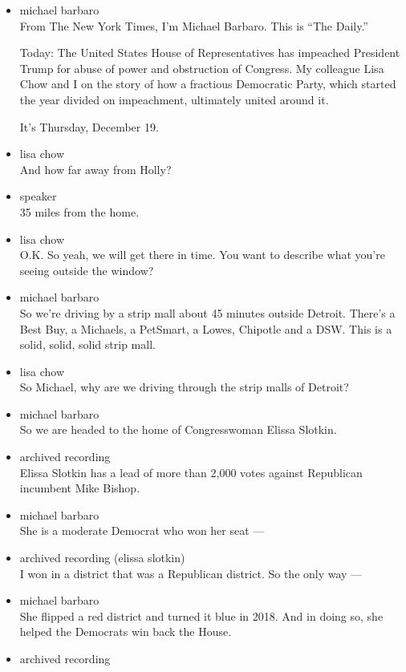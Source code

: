 \begin{itemize}
\item
  michael barbaro\\
  From The New York Times, I'm Michael Barbaro. This is ``The Daily.''

  Today: The United States House of Representatives has impeached
  President Trump for abuse of power and obstruction of Congress. My
  colleague Lisa Chow and I on the story of how a fractious Democratic
  Party, which started the year divided on impeachment, ultimately
  united around it.

  It's Thursday, December 19.
\item
  lisa chow\\
  And how far away from Holly?
\item
  speaker\\
  35 miles from the home.
\item
  lisa chow\\
  O.K. So yeah, we will get there in time. You want to describe what
  you're seeing outside the window?
\item
  michael barbaro\\
  So we're driving by a strip mall about 45 minutes outside Detroit.
  There's a Best Buy, a Michaels, a PetSmart, a Lowes, Chipotle and a
  DSW. This is a solid, solid, solid strip mall.
\item
  lisa chow\\
  So Michael, why are we driving through the strip malls of Detroit?
\item
  michael barbaro\\
  So we are headed to the home of Congresswoman Elissa Slotkin.
\item
  archived recording\\
  Elissa Slotkin has a lead of more than 2,000 votes against Republican
  incumbent Mike Bishop.
\item
  michael barbaro\\
  She is a moderate Democrat who won her seat ---
\item
  archived recording (elissa slotkin)\\
  I won in a district that was a Republican district. So the only way
  ---
\item
  michael barbaro\\
  She flipped a red district and turned it blue in 2018. And in doing
  so, she helped the Democrats win back the House.
\item
  archived recording\\

\end{itemize}
